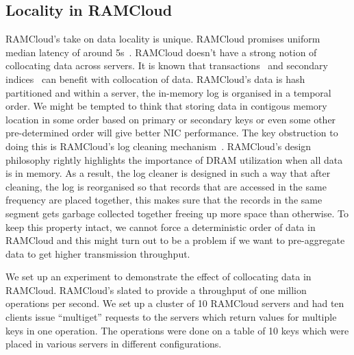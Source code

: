 \subsection{Locality in RAMCloud}
RAMCloud's take on data locality is unique. RAMCloud promises uniform median latency of around 5\textmu s~\cite{ramcloud}. RAMCloud doesn't have a strong notion of collocating data across servers. 
It is known that transactions~\cite{ramcloudtx} and secondary indices~\cite{slik} can benefit with collocation of data. RAMCloud's data is hash partitioned and within a server, the in-memory log is organised 
in a temporal order. We might be tempted to think that storing data in contigous memory location in some order based on primary or secondary keys or even some other pre-determined order will give better NIC performance. 
The key obstruction to doing this is RAMCloud's log cleaning mechanism~\cite{ramcloudfast}. RAMCloud's design philosophy rightly highlights the importance of DRAM utilization when all data is in memory. 
As a result, the log cleaner is designed in such a way that after cleaning, the log is reorganised so that records that are accessed in the same frequency are placed together, this makes sure that the records in the same 
segment gets garbage collected together freeing up more space than otherwise. To keep this property intact, we cannot force a deterministic order of data in RAMCloud and this might turn out to be a problem if 
we want to pre-aggregate data to get higher transmission throughput.

We set up an experiment to demonstrate the effect of collocating data in RAMCloud. RAMCloud's slated to provide a throughput of one million operations per second. We set up a cluster of 10 RAMCloud servers 
and had ten clients issue ``multiget'' requests to the servers which return values for multiple keys in one operation. The operations were done on a table of 10 keys which were placed in various servers in different 
configurations. 

